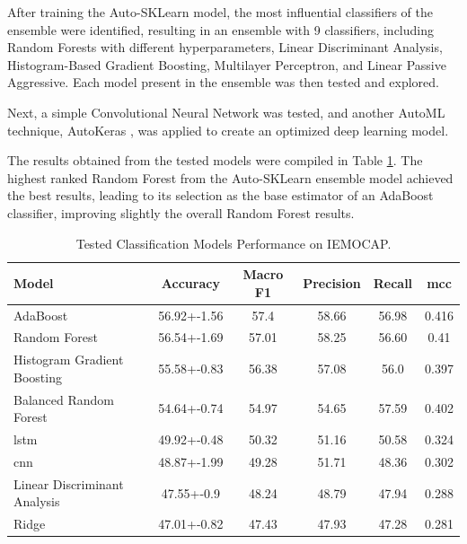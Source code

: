 After training the Auto-SKLearn model, the most influential classifiers of the ensemble were identified, resulting in an ensemble with 9 classifiers, including Random Forests with different hyperparameters, Linear Discriminant Analysis, Histogram-Based Gradient Boosting, Multilayer Perceptron, and Linear Passive Aggressive. Each model present in the ensemble was then tested and explored.

Next, a simple Convolutional Neural Network was tested, and another AutoML technique, AutoKeras \cite{jin2019auto}, was applied to create an optimized deep learning model.

The results obtained from the tested models were compiled in Table \ref{tab:models}. The highest ranked Random Forest from the Auto-SKLearn ensemble model achieved the best results, leading to its selection as the base estimator of an AdaBoost classifier, improving slightly the overall Random Forest results.

\begin{table}[H]
	\centering
	\caption{Tested Classification Models Performance on IEMOCAP.}
	\label{tab:models}
	\begin{tabular}{lccccc}
		\toprule
		Model & Accuracy & Macro F1 & Precision & Recall & \ac{mcc} \\
		\midrule
		
		AdaBoost & 56.92+-1.56 & 57.4 & 58.66 & 56.98 & 0.416 \\
		
		Random Forest & 56.54+-1.69 & 57.01 & 58.25 & 56.60 & 0.41 \\
		
		Histogram Gradient Boosting & 55.58+-0.83 & 56.38 & 57.08 & 56.0 &  0.397 \\
		
		Balanced Random Forest & 54.64+-0.74 & 54.97 & 54.65 & 57.59 & 0.402 \\
		
		\ac{lstm} & 49.92+-0.48 & 50.32 & 51.16 & 50.58 & 0.324 \\
		
		\ac{cnn} & 48.87+-1.99 & 49.28  & 51.71 & 48.36 & 0.302 \\
		
		Linear Discriminant Analysis & 47.55+-0.9 & 48.24 & 48.79& 47.94 & 0.288 \\
		
		Ridge & 47.01+-0.82 & 47.43 & 47.93 & 47.28 & 0.281 \\
		
		\bottomrule
	\end{tabular}
\end{table}



